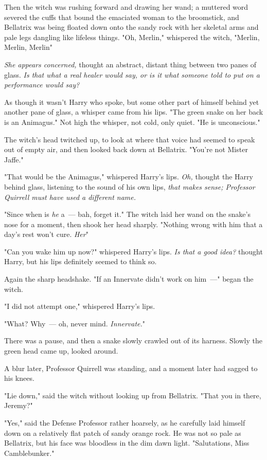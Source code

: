 Then the witch was rushing forward and drawing her wand; a muttered word
severed the cuffs that bound the emaciated woman to the broomstick, and
Bellatrix was being floated down onto the sandy rock with her skeletal arms and
pale legs dangling like lifeless things. "Oh, Merlin," whispered the witch,
"Merlin, Merlin, Merlin{\el}"

\emph{She appears concerned,} thought an abstract, distant thing between two
panes of glass. \emph{Is that what a real healer would say, or is it what
someone told to put on a performance would say?}

As though it wasn't Harry who spoke, but some other part of himself behind yet
another pane of glass, a whisper came from his lips. "The green snake on her
back is an Animagus." Not high the whisper, not cold, only quiet. "He is
unconscious."

The witch's head twitched up, to look at where that voice had seemed to speak
out of empty air, and then looked back down at Bellatrix. "You're not Mister
Jaffe."

"That would be the Animagus," whispered Harry's lips. \emph{Oh,} thought the
Harry behind glass, listening to the sound of his own lips, \emph{that makes
sense; Professor Quirrell must have used a different name.}

"Since when is \emph{he} a~--- bah, forget it." The witch laid her wand on the
snake's nose for a moment, then shook her head sharply. "Nothing wrong with him
that a day's rest won't cure. \emph{Her{\el}}"

"Can you wake him up now?" whispered Harry's lips. \emph{Is that a good idea?}
thought Harry, but his lips definitely seemed to think so.

Again the sharp headshake. "If an Innervate didn't work on him~---" began the
witch.

"I did not attempt one," whispered Harry's lips.

"What? Why~--- oh, never mind. \emph{Innervate.}"

There was a pause, and then a snake slowly crawled out of its harness. Slowly
the green head came up, looked around.

A blur later, Professor Quirrell was standing, and a moment later had sagged to
his knees.

"Lie down," said the witch without looking up from Bellatrix. "That you in
there, Jeremy?"

"Yes," said the Defense Professor rather hoarsely, as he carefully laid himself
down on a relatively flat patch of sandy orange rock. He was not so pale as
Bellatrix, but his face was bloodless in the dim dawn light. "Salutations, Miss
Camblebunker."

